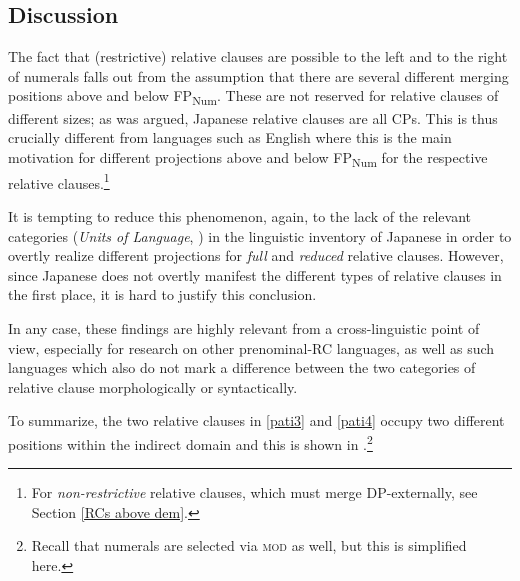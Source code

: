 \subsection{Discussion} \label{RC discussion}

The fact that (restrictive) relative clauses are possible to the left and to the right of numerals falls out from the assumption that there are several different merging positions above and below FP\textsubscript{Num}. These are not reserved for relative clauses of different sizes; as was argued, Japanese relative clauses are all CPs. This is thus crucially different from languages such as English where this is the main motivation for different projections above and below FP\textsubscript{Num} for the respective relative clauses.\footnote{For \textit{non-restrictive} relative clauses, which must merge DP-externally, see Section \ref{RCs above dem}.}

It is tempting to reduce this phenomenon, again, to the lack of the relevant categories (\textit{Units of Language}, \citealt{wiltschko:2014:universal}) in the linguistic inventory of Japanese in order to overtly realize different projections for \textit{full} and \textit{reduced} relative clauses. However, since Japanese does not overtly manifest the different types of relative clauses in the first place, it is hard to justify this conclusion.

In any case, these findings are highly relevant from a cross-linguistic point of view, especially for research on other prenominal-RC languages, as well as such languages which also do not mark a difference between the two categories of relative clause morphologically or syntactically.

To summarize, the two relative clauses in \ref{pati3} and \ref{pati4} occupy two different positions within the indirect domain and this is shown in .\footnote{Recall that numerals are selected via \textsc{mod} as well, but this is simplified here.}

